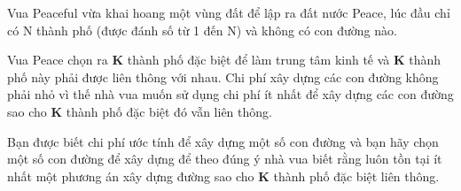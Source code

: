 Vua Peaceful vừa khai hoang một vùng đất để lập ra đất nước Peace, lúc đầu chỉ có N thành phố (được đánh số từ 1 đến N) và không có con đường nào.

Vua Peace chọn ra \textbf{ K } thành phố đặc biệt để làm trung tâm kinh tế và \textbf{ K } thành phố này phải được liên thông với nhau. Chi phí xây dựng các con đường không phải nhỏ vì thế nhà vua muốn sử dụng chi phí ít nhất để xây dựng các con đường sao cho \textbf{ K } thành phố đặc biệt đó vẫn liên thông.

Bạn được biết chi phí ước tính để xây dựng một số con đường và bạn hãy chọn một số con đường để xây dựng để theo đúng ý nhà vua biết rằng luôn tồn tại ít nhất một phương án xây dựng đường sao cho \textbf{ K } thành phố đặc biệt liên thông.

\